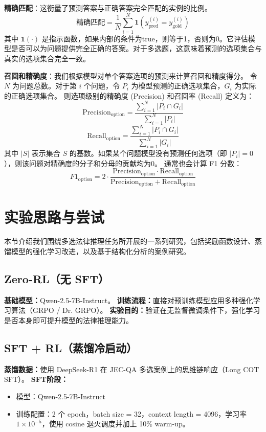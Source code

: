 \documentclass{pkuthesis}
\begin{document}
\textbf{精确匹配}：这衡量了预测答案与正确答案完全匹配的实例的比例。
$$ \text{精确匹配} = \frac{1}{N} \sum_{i=1}^{N} \mathbf{1}(y^{(i)}_{\text{pred}} = y^{(i)}_{\text{gold}}) $$
其中 $\mathbf{1}(\cdot)$ 是指示函数，如果内部的条件为true，则等于1，否则为0。它评估模型是否可以为问题提供完全正确的答案。对于多选题，这意味着预测的选项集合与真实的选项集合完全一致。

\textbf{召回和精确度}：我们根据模型对单个答案选项的预测来计算召回和精度得分。
令 $N$ 为问题总数。对于第 $i$ 个问题，令 $P_i$ 为模型预测的正确选项集合，$G_i$ 为实际的正确选项集合。
则选项级别的精确度 (Precision) 和召回率 (Recall) 定义为：
$$ \text{Precision}_{\text{option}} = \frac{\sum_{i=1}^N |P_i \cap G_i|}{\sum_{i=1}^N |P_i|} $$
$$ \text{Recall}_{\text{option}} = \frac{\sum_{i=1}^N |P_i \cap G_i|}{\sum_{i=1}^N |G_i|} $$
其中 $|S|$ 表示集合 $S$ 的基数。如果某个问题模型没有预测任何选项（即 $|P_i|=0$），则该问题对精确度的分子和分母的贡献均为0。
通常也会计算 F1 分数：
$$ F1_{\text{option}} = 2 \cdot \frac{\text{Precision}_{\text{option}} \cdot \text{Recall}_{\text{option}}}{\text{Precision}_{\text{option}} + \text{Recall}_{\text{option}}} $$


\section{实验思路与尝试}

本节介绍我们围绕多选法律推理任务所开展的一系列研究，包括奖励函数设计、蒸馏模型的强化学习改进，以及基于结构化分析的案例研究。

\subsection{Zero-RL（无 SFT）}

\textbf{基础模型：}Qwen-2.5-7B-Instruct。  
\textbf{训练流程：}直接对预训练模型应用多种强化学习算法（GRPO / Dr. GRPO）。  
\textbf{实验目的：}验证在无监督微调条件下，强化学习是否本身即可提升模型的法律推理能力。

\subsection{SFT + RL（蒸馏冷启动）}

\textbf{蒸馏数据：}使用 DeepSeek-R1 在 JEC-QA 多选案例上的思维链响应（Long COT SFT）。  
\textbf{SFT阶段：}
\begin{itemize}
  \item 模型：Qwen-2.5-7B-Instruct
  \item 训练配置：2 个 epoch，batch size = 32，context length = 4096，学习率 $1\times10^{-5}$，使用 cosine 退火调度并加上 10\% warm-up。
\end{itemize}
\end{document}
